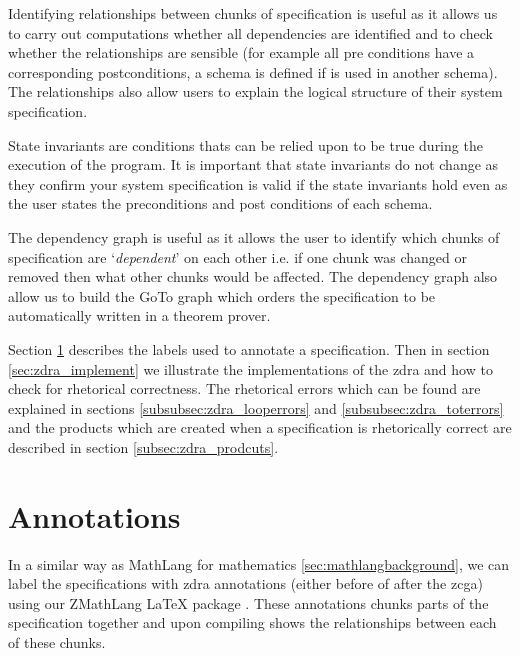 Identifying relationships between chunks of specification is useful as it allows
us to carry out computations whether all dependencies are identified and to
check whether the relationships are sensible (for example all pre conditions
have a corresponding postconditions, a schema is defined if is used in another
schema). The relationships also allow users to explain the logical structure of
their system specification.

State invariants are conditions thats can be relied upon to be true during the
execution of the program. It is important that state invariants do not change as
they confirm your system specification is valid if the state invariants hold
even as the user states the preconditions and post conditions of each schema. 

The dependency graph is useful as it allows the user to identify which chunks of
specification are `\textit{dependent}' on each other i.e. if one chunk was
changed or removed then what other chunks would be affected. The dependency
graph also allow us to build the GoTo graph which orders the
specification to be automatically written in a theorem prover.

Section \ref{sec:zdra_annotate} describes the labels used to annotate a
specification. Then in section \ref{sec:zdra_implement} we illustrate the
implementations of the \gls{zdra} and how to check for rhetorical correctness.
The rhetorical errors which can be found are explained in sections
\ref{subsubsec:zdra_looperrors} and \ref{subsubsec:zdra_toterrors} and the
products which are created when a specification is rhetorically correct are
described in section \ref{subsec:zdra_prodcuts}.

\section{Annotations}
\label{sec:zdra_annotate}

In a similar way as  MathLang for mathematics \ref{sec:mathlangbackground}, we can label the specifications with
\gls{zdra} annotations (either before of after the \gls{zcga}) using our ZMathLang \LaTeX{} package . These
annotations chunks parts of the specification together and upon compiling shows
the relationships between each of these chunks.

